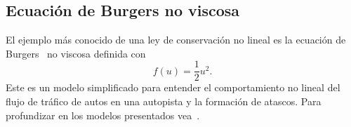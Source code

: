 \subsection*{Ecuación de Burgers no viscosa}

El ejemplo más conocido de una ley de conservación no lineal es la
ecuación de Burgers~\cite{Burgers1995} no viscosa definida con
\begin{equation*}
	f\left(u\right)=
	\frac{1}{2}u^{2}.
\end{equation*}
Este es un modelo simplificado para entender el comportamiento no
lineal del flujo de tráfico de autos en una autopista y la formación
de atascos.
Para profundizar en los modelos presentados vea~\cite{Vázquez2015}.








